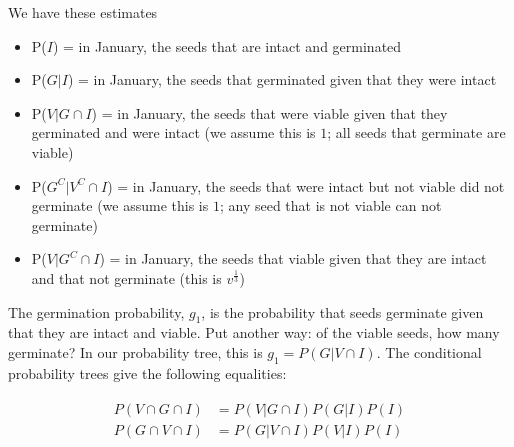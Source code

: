 \documentclass[12pt, oneside]{article}   	%
\begin{document}
 \newline
  

  We have these estimates
  
  \begin{itemize}
	\item P($I$) = in January, the seeds that are intact and germinated
	\item P($G|I$) = in January, the seeds that germinated given that they were intact 
	\item P($V|G \cap I$) = in January, the seeds that were viable given that they germinated and were intact (we assume this is $1$; all seeds that germinate are viable)
	\item P($G^C|V^C \cap I$) = in January, the seeds that were intact but not viable did not germinate (we assume this is $1$; any seed that is not viable can not germinate)
		\item P($V|G^C \cap I$) = in January, the seeds that viable given that they are intact and that not germinate (this is $v^{\frac{1}{3}}$)
\end{itemize}
  
The germination probability, $g_1$, is the probability that seeds germinate given that they are intact and viable. Put another way: of the viable seeds, how many germinate? In our probability tree, this is $g_1 = P(G | V \cap I)$. The conditional probability trees give the following equalities:
  
  \begin{align}
\begin{split}
	P(V \cap G \cap I) &= P(V | G \cap I) P(G | I) P(I) \\
	P(G \cap V \cap I) &= P(G | V \cap I) P(V | I) P(I) \label{eq:fullConditional}	
  \end{split}
\end{align}
\end{document}
